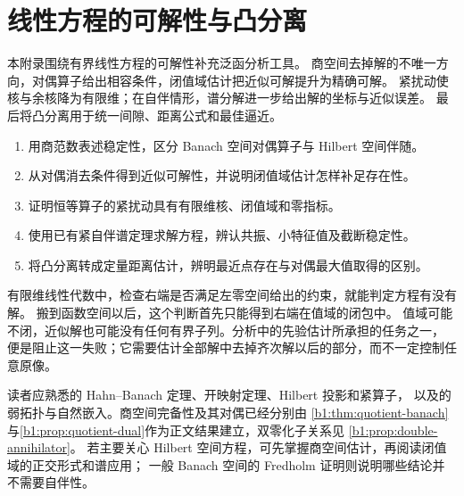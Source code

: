 \chapter{线性方程的可解性与凸分离}
\label{b1:app:C}

\begin{chapterabstract}
本附录围绕有界线性方程的可解性补充泛函分析工具。
商空间去掉解的不唯一方向，对偶算子给出相容条件，闭值域估计把近似可解提升为精确可解。
紧扰动使核与余核降为有限维；在自伴情形，谱分解进一步给出解的坐标与近似误差。
最后将凸分离用于统一间隙、距离公式和最佳逼近。
\end{chapterabstract}

\begin{learninggoals}
\begin{enumerate}
\item\label{b1:item:C1-goal-quotient}用商范数表述稳定性，区分 Banach 空间对偶算子与 Hilbert 空间伴随。
\item\label{b1:item:C1-goal-closed-range}从对偶消去条件得到近似可解性，并说明闭值域估计怎样补足存在性。
\item\label{b1:item:C1-goal-fredholm}证明恒等算子的紧扰动具有有限维核、闭值域和零指标。
\item\label{b1:item:C1-goal-spectral}使用已有紧自伴谱定理求解方程，辨认共振、小特征值及截断稳定性。
\item\label{b1:item:C1-goal-separation}将凸分离转成定量距离估计，辨明最近点存在与对偶最大值取得的区别。
\end{enumerate}
\end{learninggoals}

有限维线性代数中，检查右端是否满足左零空间给出的约束，就能判定方程有没有解。
搬到函数空间以后，这个判断首先只能得到右端在值域的闭包中。
值域可能不闭，近似解也可能没有任何有界子列。分析中的先验估计所承担的任务之一，
便是阻止这一失败；它需要估计全部解中去掉齐次解以后的部分，而不一定控制任意原像。

\ProseParagraphBreak

读者应熟悉的 Hahn--Banach 定理、开映射定理、Hilbert 投影和紧算子，
以及的弱拓扑与自然嵌入。商空间完备性及其对偶已经分别由%
\cref{b1:thm:quotient-banach}与\cref{b1:prop:quotient-dual}作为正文结果建立，双零化子关系见%
\cref{b1:prop:double-annihilator}。
若主要关心 Hilbert 空间方程，可先掌握商空间估计，再阅读闭值域的正交形式和谱应用；
一般 Banach 空间的 Fredholm 证明则说明哪些结论并不需要自伴性。

\ProseParagraphBreak

